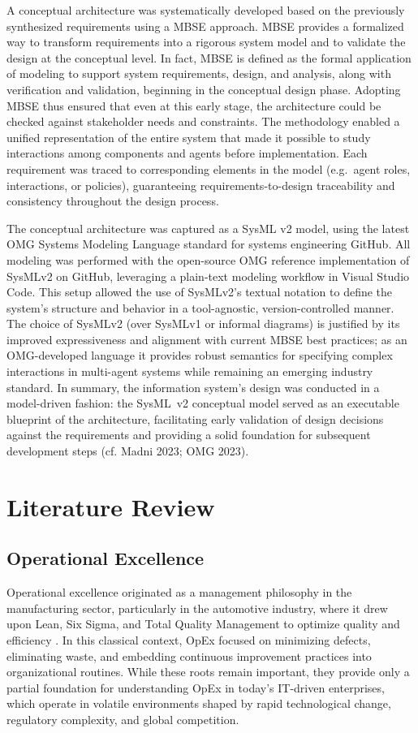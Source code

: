 A conceptual architecture was systematically developed based on the previously synthesized requirements using a MBSE approach. MBSE provides a formalized way to transform requirements into a rigorous system model and to validate the design at the conceptual level. In fact, MBSE is defined as the formal application of modeling to support system requirements, design, and analysis, along with verification and validation, beginning in the conceptual design phase. Adopting MBSE thus ensured that even at this early stage, the architecture could be checked against stakeholder needs and constraints. The methodology enabled a unified representation of the entire system that made it possible to study interactions among components and agents before implementation. Each requirement was traced to corresponding elements in the model (e.g.~agent roles, interactions, or policies), guaranteeing requirements-to-design traceability and consistency throughout the design process.

The conceptual architecture was captured as a SysML v2 model, using the latest OMG Systems Modeling Language standard for systems engineering GitHub. All modeling was performed with the open-source OMG reference implementation of SysMLv2 on GitHub, leveraging a plain-text modeling workflow in Visual Studio Code. This setup allowed the use of SysMLv2's textual notation to define the system's structure and behavior in a tool-agnostic, version-controlled manner. The choice of SysMLv2 (over SysMLv1 or informal diagrams) is justified by its improved expressiveness and alignment with current MBSE best practices; as an OMG-developed language it provides robust semantics for specifying complex interactions in multi-agent systems while remaining an emerging industry standard. In summary, the information system's design was conducted in a model-driven fashion: the SysML~v2 conceptual model served as an executable blueprint of the architecture, facilitating early validation of design decisions against the requirements and providing a solid foundation for subsequent development steps (cf. Madni 2023; OMG 2023).

\section{Literature Review}\label{sec:lit-rev}

\subsection{Operational Excellence}\label{subsec:op-ex}
Operational excellence originated as a management philosophy in the manufacturing sector, particularly in the automotive industry, where it drew upon Lean, Six Sigma, and Total Quality Management to optimize quality and efficiency \parencite{juranQuality1999, womackLean2013}. In this classical context, OpEx focused on minimizing defects, eliminating waste, and embedding continuous improvement practices into organizational routines. While these roots remain important, they provide only a partial foundation for understanding OpEx in today's IT-driven enterprises, which operate in volatile environments shaped by rapid technological change, regulatory complexity, and global competition.

